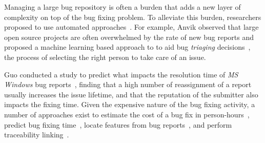 Managing a large bug repository is often a burden that adds a new layer of complexity on top of the bug fixing problem.
To alleviate this burden, researchers proposed to use automated approaches~\cite{Weim2006}.
For example, Anvik \etal observed that large open source projects are often overwhelmed by the rate of new bug reports and proposed a machine learning based approach to to aid bug \emph{triaging} decisions~\cite{Anvi2006a}, the process of selecting the right person to take care of an issue.

Guo \etal conducted a study to predict what impacts the resolution time of \textit{MS Windows} bug reports~\cite{Guo2010}, finding that a high number of reassignment of a report usually increases the issue lifetime, and that the reputation of the submitter also impacts the fixing time.
Given the expensive nature of the bug fixing activity, a number of approaches exist to estimate the cost of a bug fix in person-hours~\cite{Weis2007a}, predict bug fixing time~\cite{Gige2010}, locate features from bug reports~\cite{Dit2013a}, and perform traceability linking~\cite{Biss2013a}.


%
%

